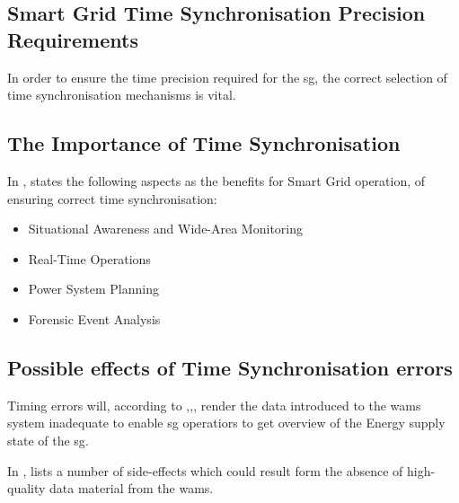 %


\subsection[Smart Grid Time Sync Precision Requirements]{Smart Grid Time Synchronisation Precision Requirements}

In order to ensure the time precision required for the \acrshort{sg}, the correct selection of time synchronisation mechanisms is vital. 










\subsection{The Importance of Time Synchronisation}

In \cite{dagle2019importance}, \citeauthor{dagle2019importance} states the following aspects as the benefits for Smart Grid operation, of ensuring correct time synchronisation:


\begin{itemize}
    \item  Situational Awareness and Wide-Area Monitoring
    \item  Real-Time Operations
    \item  Power System Planning 
    \item  Forensic Event Analysis
    
\end{itemize}

\subsection{Possible effects of Time Synchronisation errors}
Timing errors will, according to ,,, render the data introduced to the \acrshort{wams} system inadequate to enable \acrshort{sg} operatiors to get overview of the Energy supply state of the \acrshort{sg}.

In \Cite{martin2019impact}, \citeauthor{martin2019impact} lists a number of side-effects which could result form the absence of high-quality data material from the \acrshort{wams}.


